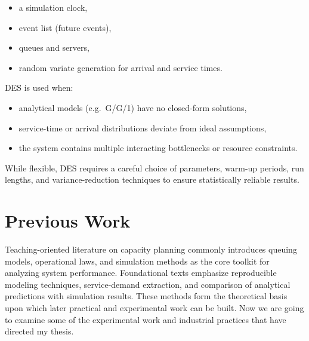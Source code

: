 \begin{itemize}
    \item a simulation clock,
    \item event list (future events),
    \item queues and servers,
    \item random variate generation for arrival and service times.
\end{itemize}

DES is used when:

\begin{itemize}
    \item analytical models (e.g.\ G/G/1) have no closed-form solutions,
    \item service-time or arrival distributions deviate from ideal assumptions,
    \item the system contains multiple interacting bottlenecks or
          resource constraints.
\end{itemize}

While flexible, DES requires a careful choice of parameters, warm-up
periods, run lengths, and variance-reduction techniques to ensure
statistically reliable results.

\section{Previous Work}

Teaching-oriented literature on capacity planning commonly introduces
queuing models, operational laws, and simulation methods as the core
toolkit for analyzing system performance. Foundational texts emphasize
reproducible modeling techniques, service-demand extraction, and
comparison of analytical predictions with simulation results. These
methods form the theoretical basis upon which later practical and
experimental work can be built. Now we are going to examine some of the experimental work and industrial practices that have directed my thesis.
